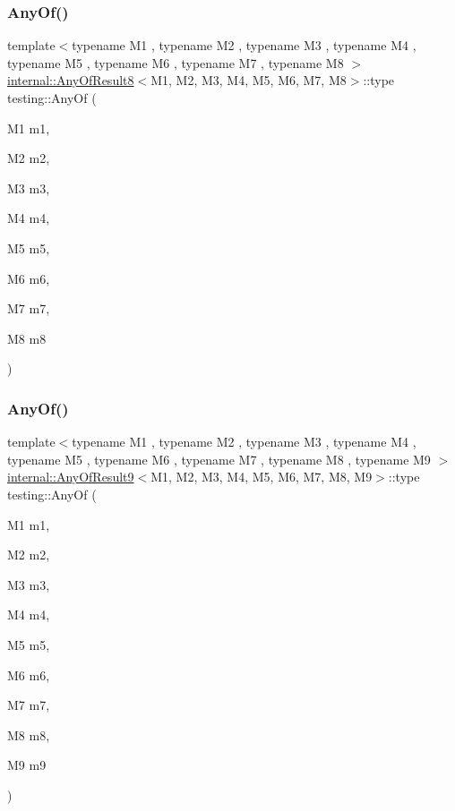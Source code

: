 \mbox{\label{namespacetesting_a9c979c62cc004664b14e0ce444e531d5}} 
\subsubsection{\texorpdfstring{AnyOf()}{AnyOf()}\hspace{0.1cm}{\footnotesize\ttfamily [7/9]}}
{\footnotesize\ttfamily template$<$typename M1 , typename M2 , typename M3 , typename M4 , typename M5 , typename M6 , typename M7 , typename M8 $>$ \\
\mbox{\hyperlink{structtesting_1_1internal_1_1AnyOfResult8}{internal\+::\+Any\+Of\+Result8}}$<$M1, M2, M3, M4, M5, M6, M7, M8$>$\+::type testing\+::\+Any\+Of (\begin{DoxyParamCaption}\item[{M1}]{m1,  }\item[{M2}]{m2,  }\item[{M3}]{m3,  }\item[{M4}]{m4,  }\item[{M5}]{m5,  }\item[{M6}]{m6,  }\item[{M7}]{m7,  }\item[{M8}]{m8 }\end{DoxyParamCaption})\hspace{0.3cm}{\ttfamily [inline]}}

\mbox{\label{namespacetesting_a873c812db953aebd4bf2ffbff0e8d770}} 
\subsubsection{\texorpdfstring{AnyOf()}{AnyOf()}\hspace{0.1cm}{\footnotesize\ttfamily [8/9]}}
{\footnotesize\ttfamily template$<$typename M1 , typename M2 , typename M3 , typename M4 , typename M5 , typename M6 , typename M7 , typename M8 , typename M9 $>$ \\
\mbox{\hyperlink{structtesting_1_1internal_1_1AnyOfResult9}{internal\+::\+Any\+Of\+Result9}}$<$M1, M2, M3, M4, M5, M6, M7, M8, M9$>$\+::type testing\+::\+Any\+Of (\begin{DoxyParamCaption}\item[{M1}]{m1,  }\item[{M2}]{m2,  }\item[{M3}]{m3,  }\item[{M4}]{m4,  }\item[{M5}]{m5,  }\item[{M6}]{m6,  }\item[{M7}]{m7,  }\item[{M8}]{m8,  }\item[{M9}]{m9 }\end{DoxyParamCaption})\hspace{0.3cm}{\ttfamily [inline]}}


